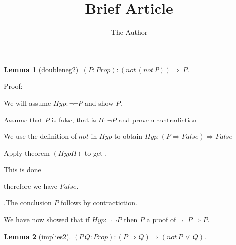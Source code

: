 \documentclass[11pt, oneside]{article}
\title{Brief Article}
\author{The Author}
\date{}							%
\newtheorem{Lemma}{Lemma}
\begin{document}
\maketitle

\begin{Lemma}[doubleneg2] 
$(P:Prop):(not\,(not\,P))\Rightarrow \,P.$
 \end{Lemma}


 Proof: \begin{subproof}We will assume $Hyp : ¬ ¬ P $ and show $P $.\begin{subproof}Assume that $P $ is false, that is $H : ¬ P $ and prove a contradiction.\begin{subproof}We use the definition of $not$ in $Hyp$ to obtain $Hyp : (P \Rightarrow False) \Rightarrow False $ \begin{subproof}Apply theorem $(Hyp H)$ to get $ $.\begin{subproof}This is done\end{subproof}\end{subproof} therefore we have $False $.\end{subproof}.The conclusion $P $ follows by contractiction.\end{subproof} We have now showed that if $Hyp : ¬ ¬ P $ then $P $ a proof of $¬ ¬ P \Rightarrow P $.\end{subproof}\begin{Lemma}[implies2] 
$(P\,Q:Prop):(P\Rightarrow Q)\Rightarrow (not\,P\,\lor \,Q).$
 \end{Lemma}
\end{document}
